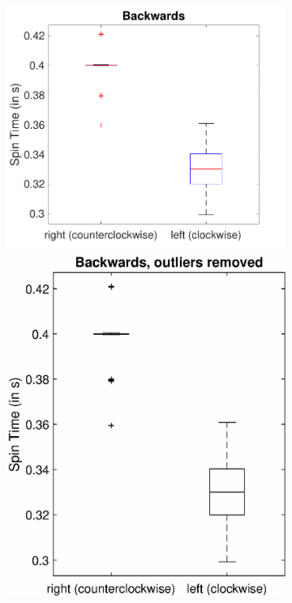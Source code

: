 \documentclass[a4paper,twoside]{book}
\begin{document}
\begin{description}
\begin{figure}[h]
\begin{subfigure}[t]{0.4\textwidth}
  \includegraphics[width=\textwidth, center]{img/backwards}\\[1cm]
  \includegraphics[width=\textwidth, center]{img/backwards2}
  \end{subfigure}


\end{figure}
\end{description}
\end{document}
